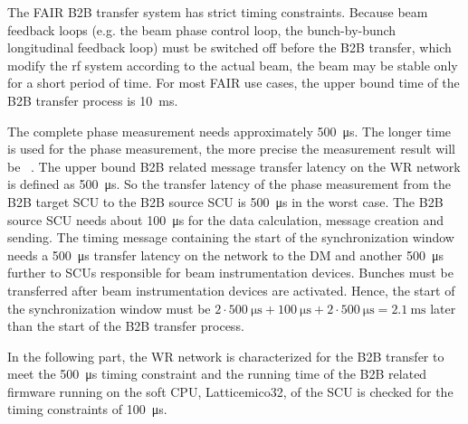 The FAIR B2B transfer system has strict timing constraints. Because beam feedback loops (e.g. the beam phase control
loop, the bunch-by-bunch longitudinal feedback loop) must be switched off before the B2B transfer, which modify the rf system according to the actual beam, the beam may be stable only for a short period of time. For most FAIR use cases, the upper bound time of the B2B transfer process is \SI{10}{\ms}. 

The complete phase measurement needs approximately \SI{500}{\us}. The longer time is used for the phase measurement, the
more precise the measurement result will be ~\cite{ferrand_development_nodate}. The upper bound B2B related message transfer latency  on the WR network is defined as \SI{500}{\us}. So the transfer latency of the phase measurement from the B2B target SCU to the B2B source SCU is \SI{500}{\us} in the worst case. The B2B source SCU needs about \SI{100}{\us} for the data calculation, message creation and sending. The timing message containing the start of the synchronization window needs a \SI{500}{\us} transfer latency on the network to the DM and another \SI{500}{\us} further to SCUs responsible for beam instrumentation devices. Bunches must be transferred  after beam instrumentation devices are activated. Hence, the start of the synchronization window must be $2 \cdot \SI{500}{\us} + \SI{100}{\us} + 2\cdot\SI{500}{\us} = \SI{2.1}{\ms}$ later than the start of the B2B transfer process. 

In the following part, the WR network is characterized for the B2B transfer to meet the \SI{500}{\us} timing constraint and the running time of the B2B related firmware running on the soft CPU, Latticemico32, of the SCU is checked for the timing constraints of \SI{100}{\us}.

